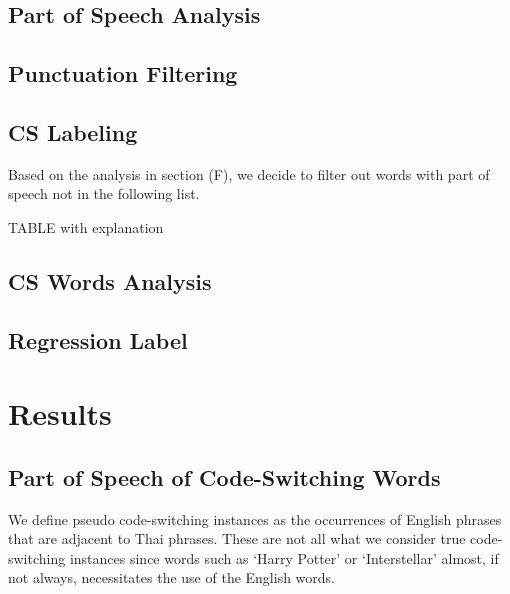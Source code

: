 \documentclass[conference]{IEEEtran}
\begin{document}
\subsection{Part of Speech Analysis}





\subsection{Punctuation Filtering}


\subsection{CS Labeling}



Based on the analysis in section (F), we decide to filter out words with part of speech not in the following list.

TABLE with explanation








\subsection{CS Words Analysis}



\subsection{Regression Label}








\newpage
\section{Results}
\subsection{Part of Speech of Code-Switching Words}
We define pseudo code-switching instances as the occurrences of English phrases that are adjacent to Thai phrases.  These are not all what we consider   true code-switching instances since words such as `Harry Potter' or `Interstellar' almost, if not always, necessitates the use of the English words. 
\end{document}
